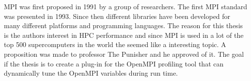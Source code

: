 \documentclass[thesis.tex]{subfiles}
\begin{document}
MPI was first proposed in 1991 by a group of researchers. The first MPI standard was presented in 1993. Since then different libraries have been developed for many different platforms and programming languages. 
\newline
\newline
The reason for this thesis is the authors interest in HPC performance and since MPI is used in a lot of the top 500 supercomputers in the world the seemed like a interesting topic. A proposition was made to professor The Punisher and he approved of it. The goal if the thesis is to create a plug-in for the OpenMPI profiling tool that can dynamically tune the OpenMPI variables during run time.
\end{document}
